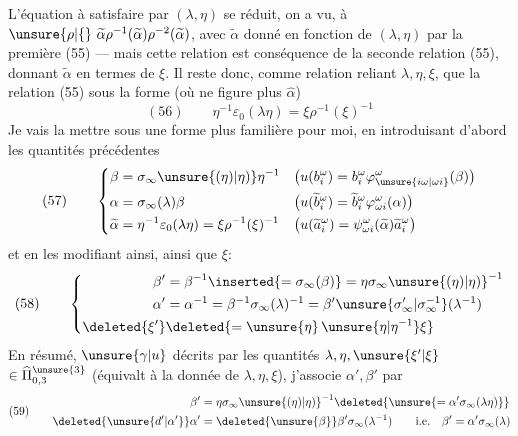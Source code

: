 L'équation à satisfaire par $(\lambda,\eta)$ se réduit, on a vu, à $\unsure{\rho|\{}\ \widetilde\alpha\rho^{-1}(\widetilde\alpha)\rho^{-2}(\widetilde\alpha)$, avec $\widetilde\alpha$ donné en fonction de $(\lambda,\eta)$ par la première   (55) --- mais cette relation  est conséquence de la seconde relation (55), donnant $\widetilde\alpha$ en termes de $\xi$. Il reste donc, comme relation reliant $\lambda,\eta,\xi$, que la relation (55) sous la forme (où ne figure plus $\widehat\alpha$)
\[
(56)\qquad\eta^{-1}\varepsilon_0(\lambda\eta)=\xi\rho^{-1}(\xi)^{-1}
\]
Je vais la mettre sous une forme plus familière pour moi, en introduisant d'abord les quantités précédentes
\[
(57)\qquad\left\{\begin{aligned}
\beta&=\sigma_\infty\unsure{(\eta)|\eta)}\eta^{-1}
&&\bigl(u(b_i^\omega)=b_i^\omega\varphi_{\unsure{i\omega|\omega i}}^\omega(\beta)\bigr)\\
\alpha&=\sigma_\infty(\lambda)\beta
&&\bigl(u(\widetilde b_i^\omega)=\widetilde b_i^\omega\varphi_{\omega i}^\omega(\alpha)\bigr)\\
\widetilde\alpha&=\eta^{-1}\varepsilon_0(\lambda\eta)=\xi\rho^{-1}(\xi)^{-1}
&&\bigl(u(\widetilde a_i^\omega)=\psi_{\omega i}^\omega(\widetilde\alpha)\widetilde a_i^\omega\bigr)
\end{aligned}\right.
\]
et en les modifiant ainsi, ainsi que $\xi$:
\[
(58)\qquad\left\{\begin{aligned}
\beta'&=\beta^{-1}\inserted{=\sigma_\infty(\beta)}=\eta\sigma_\infty\unsure{(\eta)|\eta)}^{-1}\\
\alpha'&=\alpha^{-1}=\beta^{-1}\sigma_\infty(\lambda)^{-1}=\beta'\unsure{\sigma'_\infty|\sigma_\infty^{-1}}(\lambda^{-1})\\
\deleted{\xi'}&\deleted{=\unsure{\eta}\,\unsure{\eta|\eta^{-1}}\xi}
\end{aligned}\right.
\]
En résumé,  $\unsure{\gamma|u}$ décrits par les quantités \textcircled{$\lambda,\eta,\unsure{\xi'|\xi}$} $\in\widehat\Pi_{0,3}^{\unsure{3}}$ (équivalt à la donnée de $\lambda,\eta,\xi$),  j'associe $\alpha',\beta'$ par
\[
(59)\qquad\begin{aligned}
\beta'&=\eta\sigma_\infty\unsure{(\eta)|\eta)}^{-1}\deleted{\unsure{=\alpha'\sigma_\infty(\lambda\eta)}}\\
\deleted{\unsure{d'|\alpha'}}\alpha'&=\deleted{\unsure{\beta}}\beta'\sigma_\infty(\lambda^{-1})
\qquad\text{i.e.}\quad\beta'=\alpha'\sigma_\infty(\lambda)
\end{aligned}
\]

